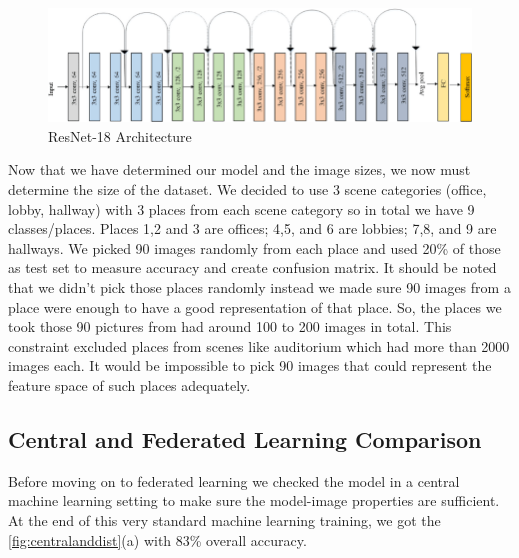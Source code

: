 \documentclass[11pt]{article}
\begin{document}
\begin{figure}[h!]
  \includegraphics[scale=0.5]{resnet18}
  \caption{ResNet-18 Architecture}
  \label{fig:resnet18}
\end{figure}

\par Now that we have determined our model and the image sizes, we now must determine the size of the dataset. We decided to use 3 scene categories (office, lobby, hallway) with 3 places from each scene category so in total we have 9 classes/places. Places 1,2 and 3 are offices; 4,5, and 6 are lobbies; 7,8, and 9 are hallways. We picked 90 images randomly from each place and used 20\% of those as test set to measure accuracy and create confusion matrix. It should be noted that we didn’t pick those places randomly instead we made sure 90 images from a place were enough to have a good representation of that place. So, the places we took those 90 pictures from had around 100 to 200 images in total. This constraint excluded places from scenes like auditorium which had more than 2000 images each. It would be impossible to pick 90 images that could represent the feature space of such places adequately. 

\subsection{Central and Federated Learning Comparison}

\par Before moving on to federated learning we checked the model in a central machine learning setting to make sure the model-image properties are sufficient. At the end of this very standard machine learning training, we got the \ref{fig:centralanddist}{(a)} with 83\% overall accuracy.
\end{document}
